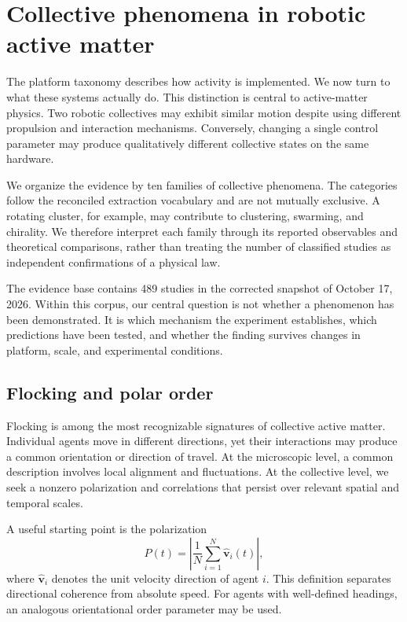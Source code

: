 \section{Collective phenomena in robotic active matter}
\label{sec:phenomena}

The platform taxonomy describes how activity is implemented.
We now turn to what these systems actually do. This distinction
is central to active-matter physics. Two robotic collectives may
exhibit similar motion despite using different propulsion and
interaction mechanisms. Conversely, changing a single control
parameter may produce qualitatively different collective states
on the same hardware.

We organize the evidence by ten families of collective phenomena.
The categories follow the reconciled extraction vocabulary and
are not mutually exclusive. A rotating cluster, for example, may
contribute to clustering, swarming, and chirality. We therefore
interpret each family through its reported observables and
theoretical comparisons, rather than treating the number of
classified studies as independent confirmations of a physical law.

The evidence base contains 489 studies in the corrected snapshot
of October 17, 2026. Within this corpus, our central question
is not whether a phenomenon has been demonstrated. It is which
mechanism the experiment establishes, which predictions have
been tested, and whether the finding survives changes in
platform, scale, and experimental conditions.



\subsection{Flocking and polar order}
\label{sec:phenomena-flocking}

Flocking is among the most recognizable signatures of collective
active matter. Individual agents move in different directions,
yet their interactions may produce a common orientation or
direction of travel. At the microscopic level, a common
description involves local alignment and fluctuations.
At the collective level, we seek a nonzero polarization
and correlations that persist over relevant spatial
and temporal scales.

A useful starting point is the polarization
\begin{equation}
P(t)=\left|
\frac{1}{N}\sum_{i=1}^{N}\hat{\mathbf v}_i(t)
\right|,
\label{eq:phenomena-polarization}
\end{equation}
where $\hat{\mathbf v}_i$ denotes the unit velocity
direction of agent $i$. This definition separates
directional coherence from absolute speed. For
agents with well-defined headings, an analogous
orientational order parameter may be used.


